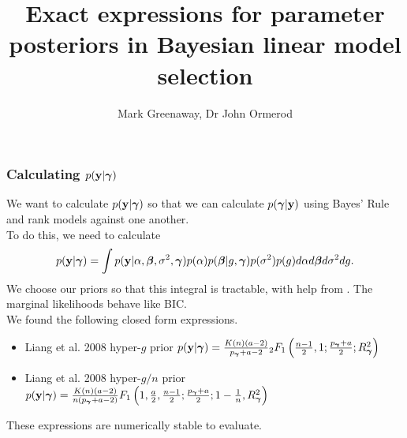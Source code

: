 \documentclass{beamer}
\title{Exact expressions for parameter posteriors in Bayesian linear model selection}
\author{Mark Greenaway, Dr John Ormerod}
\begin{document}
\begin{frame}
	\frametitle{Calculating $p({\bf y} | {\boldsymbol \gamma})$}
	We want to calculate $p({\bf y} | {\boldsymbol \gamma})$ so that we can calculate $p({\boldsymbol \gamma} | {\bf y})$ using Bayes' Rule and rank models against	one another. \\
	To do this, we need to calculate
	$$p({\bf y} | {\boldsymbol \gamma}) = \int p({\bf y} | \alpha, {\boldsymbol \beta}, \sigma^2, {\boldsymbol \gamma}) p(\alpha) p({\boldsymbol \beta} | g, {\boldsymbol \gamma}) p(\sigma^2) p(g) d \alpha d {\boldsymbol \beta} d \sigma^2 d g.$$
	We choose our priors so that this integral is tractable, with help from \cite{Gradshteyn1988}.
	The marginal likelihoods behave like BIC. \\
	We found the following closed form expressions.
	\small
	\begin{itemize}
		\item Liang et al. 2008 hyper-$g$ prior \cite{Liang2008}
			$p({\bf y} | {\boldsymbol \gamma}) = \frac{K(n) (a - 2)}{p_{\boldsymbol \gamma} + a  - 2} {}_2 F_1 \left( \frac{n-1}{2}, 1; \frac{p_{\boldsymbol \gamma} + a}{2}; R_{\boldsymbol \gamma}^2 \right)$
		\item Liang et al. 2008 hyper-$g/n$ prior \cite{Liang2008}
			$p({\bf y} | {\boldsymbol \gamma}) = \frac{K(n) (a - 2)}{n (p_{\boldsymbol \gamma} + a  - 2)} F_1 \left( 1, \frac{a}{2}, \frac{n-1}{2}; \frac{p_{\boldsymbol \gamma} + a}{2}; 1 - \frac{1}{n}, R_{\boldsymbol \gamma}^2 \right)$
	\end{itemize}
	These expressions are numerically stable to evaluate.
\end{frame}

\end{document}
